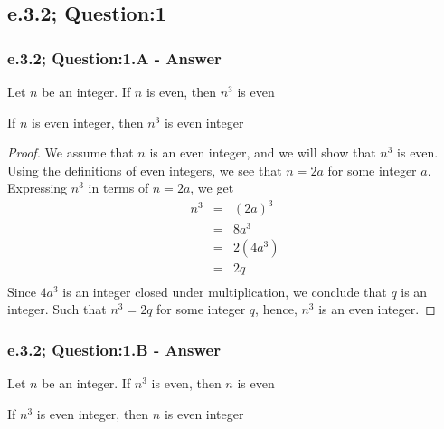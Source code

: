 \newpage
\subsection{e.3.2; Question:1}
\subsubsection*{e.3.2; Question:1.A - Answer}
Let $n$ be an integer. If $n$ is even, then  $n^3$ is even

\begin{tcolorbox}
	\begin{theorem}
	\label{the}		
		If $n$ is even integer, then  $n^3$ is even integer
	\end{theorem}
\end{tcolorbox}

\begin{proof}
We assume that $n$ is an even integer, and we will show that $n^3$ is even. Using the definitions of even integers, we see that $n = 2a$ for some integer $a$. Expressing $n^3$ in terms of $n = 2a$, we get
	\begin{eqnarray*}
		n^3 & = & (2a)^3  \nonumber \\
		& = & 8a^3  \nonumber \\
		& = & 2(4a^3)  \nonumber \\
		& = & 2q \nonumber \\
	\end{eqnarray*}
Since $4a^3$ is an integer closed under multiplication, we conclude that $q$ is an integer. Such that $n^3 = 2q$ for some integer $q$, hence, $n^3$ is an even integer.
\end{proof}




\subsubsection*{e.3.2; Question:1.B - Answer}
Let $n$ be an integer. If $n^3$ is even, then  $n$ is even

\begin{tcolorbox}
	\begin{theorem}
	\label{the}		
		If $n^3$ is even integer, then  $n$ is even integer
	\end{theorem}
\end{tcolorbox}


